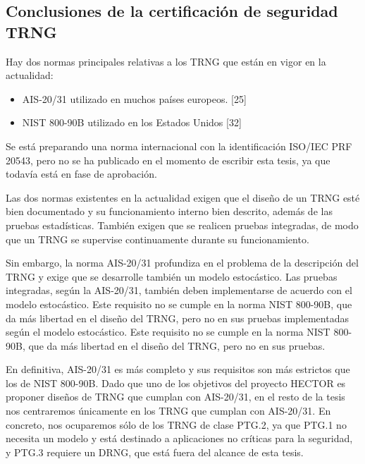 		\subsection{Conclusiones de la certificación de seguridad TRNG}
		
		Hay dos normas principales relativas a los TRNG que están en vigor en la actualidad:
		
		\begin{itemize}[noitemsep]
			\item AIS-20/31 utilizado en muchos países europeos. [25]
			\item NIST 800-90B utilizado en los Estados Unidos [32]
		\end{itemize}
	
	Se está preparando una norma internacional con la identificación ISO/IEC PRF 20543, pero no se ha publicado en el momento de escribir esta tesis, ya que todavía está en fase de aprobación.
	
	Las dos normas existentes en la actualidad exigen que el diseño de un TRNG esté bien documentado y su funcionamiento interno bien descrito, además de las pruebas estadísticas. También exigen que se realicen pruebas integradas, de modo que un TRNG se supervise continuamente durante su funcionamiento.
	
	Sin embargo, la norma AIS-20/31 profundiza en el problema de la descripción del TRNG y exige que se desarrolle también un modelo estocástico. Las pruebas integradas, según la AIS-20/31, también deben implementarse de acuerdo con el modelo estocástico. Este requisito no se cumple en la norma NIST 800-90B, que da más libertad en el diseño del TRNG, pero no en sus pruebas implementadas según el modelo estocástico. Este requisito no se cumple en la norma NIST 800-90B, que da más libertad en el diseño del TRNG, pero no en sus pruebas.
	
	En definitiva, AIS-20/31 es más completo y sus requisitos son más estrictos que los de NIST 800-90B. Dado que uno de los objetivos del proyecto HECTOR es proponer diseños de TRNG que cumplan con AIS-20/31, en el resto de la tesis nos centraremos únicamente en los TRNG que cumplan con AIS-20/31. En concreto, nos ocuparemos sólo de los TRNG de clase PTG.2, ya que PTG.1 no necesita un modelo y está destinado a aplicaciones no críticas para la seguridad, y PTG.3 requiere un DRNG, que está fuera del alcance de esta tesis.	












